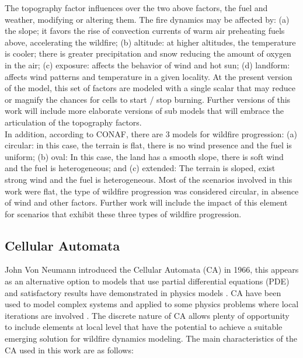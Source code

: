 \documentclass[conference]{IEEEtran}
\begin{document}
        The topography factor influences over the two above factors, the fuel and weather,
        modifying or altering them. The fire dynamics may be affected by: (a) the slope; it
        favors the rise of convection currents of warm air preheating fuels above, accelerating
        the wildfire; (b) altitude: at higher altitudes, the temperature is cooler; there is greater
        precipitation and snow reducing the amount of oxygen in the air; (c) exposure: affects
        the behavior of wind and hot sun; (d) landform: affects wind patterns and temperature
        in a given locality. At the present version of the model, this set of factors are modeled
        with a single scalar that may reduce or magnify the chances for cells to start / stop
        burning. Further versions of this work will include more elaborate versions of sub
        models that will embrace the articulation of the topography factors. \\
        
        In addition, according to CONAF, there are 3 models for wildfire progression: (a)
        circular: in this case, the terrain is flat, there is no wind presence and the fuel is
        uniform; (b) oval: In this case, the land has a smooth slope, there is soft wind and the
        fuel is heterogeneous; and (c) extended: The terrain is sloped, exist strong wind and
        the fuel is heterogeneous. Most of the scenarios involved in this work were flat, the
        type of wildfire progression was considered circular, in absence of wind and other
        factors. Further work will include the impact of this element for scenarios that exhibit
        these three types of wildfire progression.
    

    \subsection{Cellular Automata}
    
        John Von Neumann introduced the Cellular Automata (CA) in 1966, this appears as an alternative option to 
        models that use partial differential equations (PDE) and satisfactory results have demonstrated in physics 
        models \cite{toffoli1984cellular}. CA have been used to model complex systems \cite{wolfram1994cellular} 
        and applied to some physics problems where local iterations are involved \cite{chopard1991cellular, 
        gerhardt1989cellular}. The discrete nature of CA allows plenty of opportunity to include elements at local 
        level that have the potential to achieve a suitable emerging solution for wildfire dynamics modeling. 
        The main characteristics of the CA used in this work are as follows:
        
\end{document}
